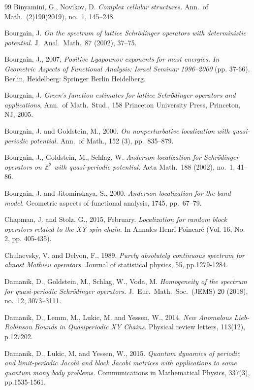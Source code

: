 \documentclass[11pt]{amsart}
\newcommand{\Z}{\mathbb Z}
\begin{document}
\begin{thebibliography}{99}
 Binyamini, G.,  Novikov, D. {\em 
Complex cellular structures.}
Ann.\ of Math.~(2)190(2019), no.~1, 145--248.

 Bourgain, J.  {\em
On the spectrum of lattice Schr\"odinger operators with deterministic potential.}
J.\ Anal.\ Math.~87 (2002), 37--75.

 Bourgain, J., 2007, {\em Positive Lyapounov exponents for most energies. In Geometric Aspects of Functional Analysis: Israel Seminar 1996–2000} (pp. 37-66). Berlin, Heidelberg: Springer Berlin Heidelberg.

 Bourgain, J.  {\em Green's function estimates for lattice Schr\"odinger operators and applications}, 
Ann.\ of Math.\ Stud., 158
Princeton University Press, Princeton, NJ, 2005. 

 Bourgain, J. and Goldstein, M., 2000. {\em On nonperturbative localization with quasi-periodic potential.} Ann.\ of Math., 152 (3),
 pp.~835--879.

  Bourgain, J.,  Goldstein, M.,  Schlag, W. {\em 
Anderson localization for Schr\"odinger operators on $\Z^2$ with quasi-periodic potential.} 
Acta Math.~188 (2002), no.~1, 41--86.

  Bourgain, J. and Jitomirskaya, S., 2000. {\em Anderson localization for the band model.} Geometric aspects of functional analysis, 1745, pp.~67--79.

Chapman, J. and Stolz, G., 2015, February. {\em Localization for random block operators related to the XY spin chain.} In Annales Henri Poincaré (Vol. 16, No. 2, pp. 405-435). 

Chulaevsky, V. and Delyon, F., 1989. {\em Purely absolutely continuous spectrum for almost Mathieu operators.} Journal of statistical physics, 55, pp.1279-1284.


 Damanik, D.,  Goldstein, M.,  Schlag, W.,  Voda, M. {\em 
Homogeneity of the spectrum for quasi-periodic Schr\"odinger operators.} J.\ Eur.\ Math.\ Soc.\ (JEMS) 20 (2018), no.~12, 3073--3111.

Damanik, D., Lemm, M., Lukic, M. and Yessen, W., 2014. {\em New Anomalous Lieb-Robinson Bounds in Quasiperiodic XY Chains}. Physical review letters, 113(12), p.127202.

Damanik, D., Lukic, M. and Yessen, W., 2015. {\em Quantum dynamics of periodic and limit-periodic Jacobi and block Jacobi matrices with applications to some quantum many body problems.} Communications in Mathematical Physics, 337(3), pp.1535-1561.


\end{thebibliography}
\end{document}
